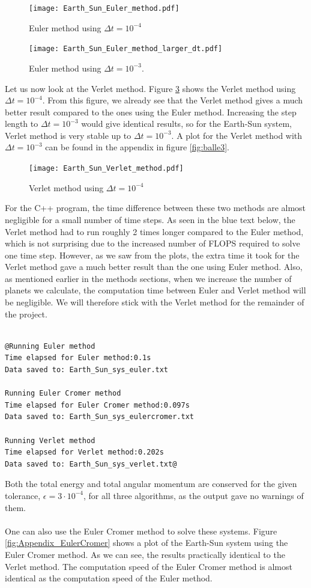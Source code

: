 \documentclass{article}
\begin{document}
\begin{figure}[!h]
\centering
\texttt{[image: Earth\_Sun\_Euler\_method.pdf]}
\caption{Euler method using $\Delta t = 10^{-4}$}
\label{fig:balle}
\end{figure}
\begin{figure}[!h]
\centering
\texttt{[image: Earth\_Sun\_Euler\_method\_larger\_dt.pdf]}
\caption{Euler method using $\Delta t = 10^{-3}$.}
\label{fig:balle1}
\end{figure}
Let us now look at the Verlet method. Figure \ref{fig:balle2} shows the Verlet method using $\Delta t = 10^{-4}$. From this figure, we already see that the Verlet method gives a much better result compared to the ones using the Euler method. Increasing the step length to $\Delta t = 10^{-3}$ would give identical results, so for the Earth-Sun system, Verlet method is very stable up to $\Delta t = 10^{-3}$. A plot for the Verlet method with $\Delta t = 10^{-3}$ can be found in the appendix in figure \ref{fig:balle3}. \\
\begin{figure}[!h]
\centering
\texttt{[image: Earth\_Sun\_Verlet\_method.pdf]}
\caption{Verlet method using $\Delta t = 10^{-4}$}
\label{fig:balle2}
\end{figure}
For the C++ program, the time difference between these two methods are almost negligible for a small number of time steps. As seen in the blue text below, the Verlet method had to run roughly 2 times longer compared to the Euler method, which is not surprising due to the increased number of FLOPS required to solve one time step. However, as we saw from the plots, the extra time it took for the Verlet method gave a much better result than the one using Euler method. Also, as mentioned earlier in the methods sections, when we increase the number of planets we calculate, the computation time between Euler and Verlet method will be negligible. We will therefore stick with the Verlet method for the remainder of the project. \\\\
\begin{lstlisting}
@Running Euler method
Time elapsed for Euler method:0.1s
Data saved to: Earth_Sun_sys_euler.txt

Running Euler Cromer method
Time elapsed for Euler Cromer method:0.097s
Data saved to: Earth_Sun_sys_eulercromer.txt

Running Verlet method
Time elapsed for Verlet method:0.202s
Data saved to: Earth_Sun_sys_verlet.txt@
\end{lstlisting}
Both the total energy and total angular momentum are conserved for the given tolerance, $\epsilon = 3\cdot 10^{-4}$, for all three algorithms, as the output gave no warnings of them. \\\\
One can also use the Euler Cromer method to solve these systems. Figure \ref{fig:Appendix_EulerCromer} shows a plot of the Earth-Sun system using the Euler Cromer method. As we can see, the results practically identical to the Verlet method. The computation speed of the Euler Cromer method is almost identical as the computation speed of the Euler method.
\end{document}
